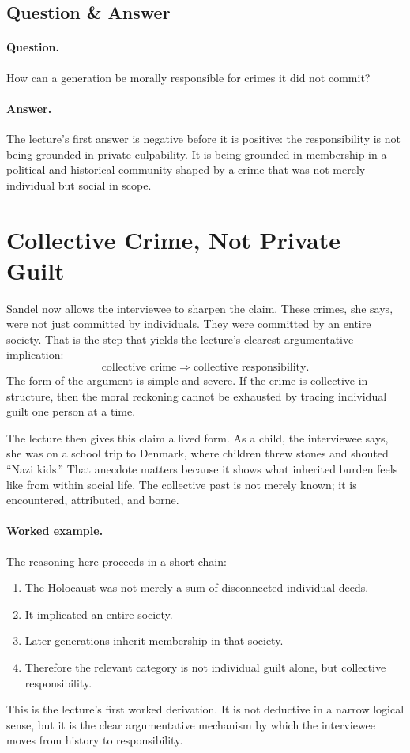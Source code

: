 \subsection{Question \& Answer}

\paragraph{Question.} How can a generation be morally responsible for crimes it did not commit?

\paragraph{Answer.} The lecture's first answer is negative before it is positive: the responsibility is not being grounded in private culpability. It is being grounded in membership in a political and historical community shaped by a crime that was not merely individual but social in scope.

\section{Collective Crime, Not Private Guilt}

Sandel now allows the interviewee to sharpen the claim. These crimes, she says, were not just committed by individuals. They were committed by an entire society. That is the step that yields the lecture's clearest argumentative implication:
\begin{equation}
\text{collective crime}
\Longrightarrow
\text{collective responsibility}.
\end{equation}
The form of the argument is simple and severe. If the crime is collective in structure, then the moral reckoning cannot be exhausted by tracing individual guilt one person at a time.

The lecture then gives this claim a lived form. As a child, the interviewee says, she was on a school trip to Denmark, where children threw stones and shouted ``Nazi kids.'' That anecdote matters because it shows what inherited burden feels like from within social life. The collective past is not merely known; it is encountered, attributed, and borne.

\paragraph{Worked example.} The reasoning here proceeds in a short chain:
\begin{enumerate}
\item The Holocaust was not merely a sum of disconnected individual deeds.
\item It implicated an entire society.
\item Later generations inherit membership in that society.
\item Therefore the relevant category is not individual guilt alone, but collective responsibility.
\end{enumerate}
This is the lecture's first worked derivation. It is not deductive in a narrow logical sense, but it is the clear argumentative mechanism by which the interviewee moves from history to responsibility.

